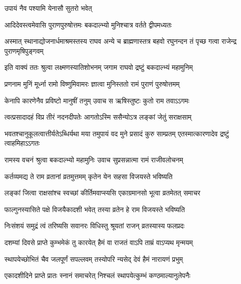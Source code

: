 \onelineshloka
{उपायं नैव पश्यामि येनासौ सुतरो भवेत्}%


\twolineshloka
{आदिदेवस्त्वमेवासि पुराणपुरुषोत्तमः}
{बकदाल्भ्यो मुनिश्चात्र वर्तते द्वीपमध्यतः}%

\threelineshloka
{अस्मात् स्थानाद्योजनार्धमाश्रमस्तस्य राघव}
{अन्ये च ब्राह्मणास्तत्र बहवो रघुनन्दन}
{तं पृच्छ गत्वा राजेन्द्र पुराणमृषिपुङ्गवम्}%


\twolineshloka
{इति वाक्यं ततः श्रुत्वा लक्ष्मणस्यातिशोभनम्}
{जगाम राघवो द्रष्टुं बकदाल्भ्यं महामुनिम्}%

\twolineshloka
{प्रणनाम मुनिं मूर्ध्ना रामो विष्णुमिवामरः}
{ज्ञात्वा मुनिस्ततो रामं पुराणं पुरुषोत्तमम्}%

\twolineshloka
{केनापि कारणेनैव प्रविष्टो मानुषीं तनुम्}
{उवाच स ऋषिस्तुष्टः कुतो राम तवाऽऽगमः}%


\twolineshloka
{त्वत्प्रसादादहं विप्र तीरं नदनदीपतेः}
{आगतोऽस्मि ससैन्योऽत्र लङ्कां जेतुं सराक्षसाम्}%

\threelineshloka
{भवतश्चानुकूलत्वात्तीर्यतेऽब्धिर्यथा मया}
{तमुपायं वद मुने प्रसादं कुरु साम्प्रतम्}%
{एतस्मात्कारणादेव द्रष्टुं त्वाहमिहाऽऽगतः}


\twolineshloka
{रामस्य वचनं श्रुत्वा बकदाल्भ्यो महामुनिः}%
{उवाच सुप्रसन्नात्मा रामं राजीवलोचनम्}


\twolineshloka
{कर्तव्यमद्य ते राम व्रतानां व्रतमुत्तमम्}
{कृतेन येन सहसा विजयस्ते भविष्यति}%

\twolineshloka
{लङ्कां जित्वा राक्षसांश्च स्वच्छां कीर्तिमवाप्स्यसि}
{एकाग्रमानसो भूत्वा व्रतमेतत् समाचर}%

\twolineshloka
{फाल्गुनस्यासिते पक्षे विजयैकादशी भवेत्}
{तस्या व्रतेन हे राम विजयस्ते भविष्यति}%

\twolineshloka
{निःसंशयं समुद्रं त्वं तरिष्यसि सवानरः}
{विधिस्तु श्रूयतां राजन् व्रतस्यास्य फलप्रदः}%

\twolineshloka
{दशम्यां दिवसे प्राप्ते कुम्भमेकं तु कारयेत्}
{हैमं वा राजतं वाऽपि ताम्रं वाऽप्यथ मृन्मयम्}%

\twolineshloka
{स्थापयेच्छोभितं चैव जलपूर्णं सपल्लवम्}
{तस्योपरि न्यसेद् देवं हैमं नारायणं प्रभुम्}%


\twolineshloka
{एकादशीदिने प्राप्ते प्रातः स्नानं समाचरेत्}
{निश्चलं स्थापयेत्कुम्भं कण्ठमाल्यानुलेपनैः}%

